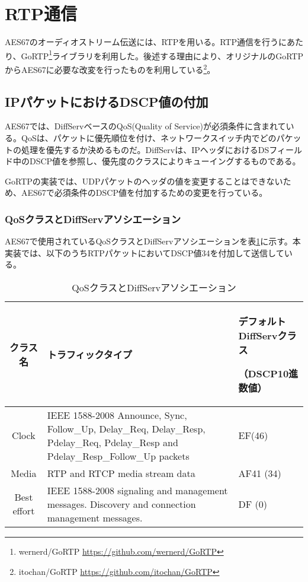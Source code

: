 \section{RTP通信}

AES67のオーディオストリーム伝送には、RTPを用いる。RTP通信を行うにあたり、GoRTP\footnote{wernerd/GoRTP \url{https://github.com/wernerd/GoRTP}}ライブラリを利用した。後述する理由により、オリジナルのGoRTPからAES67に必要な改変を行ったものを利用している\footnote{itochan/GoRTP \url{https://github.com/itochan/GoRTP}}。

\subsection{IPパケットにおけるDSCP値の付加}

AES67では、DiffServベースのQoS(Quality of Service)が必須条件に含まれている。QoSは、パケットに優先順位を付け、ネットワークスイッチ内でどのパケットの処理を優先するか決めるものだ。DiffServは、IPヘッダにおけるDSフィールド中のDSCP値を参照し、優先度のクラスによりキューイングするものである\cite{yamaha_diffserv}。

GoRTPの実装では、UDPパケットのヘッダの値を変更することはできないため、AES67で必須条件のDSCP値を付加するための変更を行っている。

\subsubsection{QoSクラスとDiffServアソシエーション}

AES67で使用されているQoSクラスとDiffServアソシエーションを表\ref{tab:diffserv_class}に示す\cite{aes67-2018}。本実装では、以下のうちRTPパケットにおいてDSCP値34を付加して送信している。

\begin{table}[tbp]
  \centering
  \caption{QoSクラスとDiffServアソシエーション}
  \label{tab:diffserv_class}
  \begin{tabular}{c|p{10cm}|p{3cm}}
    クラス名 & トラフィックタイプ & デフォルトDiffServクラス\par （DSCP10進数値） \\ \hline
    Clock & IEEE 1588-2008 Announce, Sync, Follow\_Up, Delay\_Req, Delay\_Resp, Pdelay\_Req, Pdelay\_Resp and Pdelay\_Resp\_Follow\_Up packets & EF(46) \\
    Media & RTP and RTCP media stream data & AF41 (34) \\
    Best effort & IEEE 1588-2008 signaling and management messages. Discovery and connection management messages. & DF (0)
  \end{tabular}
\end{table}

